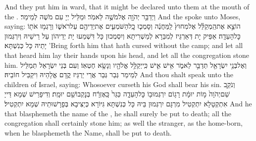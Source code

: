 {And they put him in ward, that it might be declared unto them at the mouth of the \lord.}{}
{וַיְדַבֵּ֥ר יְהֹוָ֖ה אֶל\maqqaf מֹשֶׁ֥ה לֵּאמֹֽר׃}
{וּמַלֵּיל יְיָ עִם מֹשֶׁה לְמֵימַר׃}
{And the \lord\space spoke unto Moses, saying:}{}
{הוֹצֵ֣א אֶת\maqqaf הַֽמְקַלֵּ֗ל אֶל\maqqaf מִחוּץ֙ לַֽמַּחֲנֶ֔ה וְסָמְכ֧וּ כׇֽל\maqqaf הַשֹּׁמְעִ֛ים אֶת\maqqaf יְדֵיהֶ֖ם עַל\maqqaf רֹאשׁ֑וֹ וְרָגְמ֥וּ אֹת֖וֹ כׇּל\maqqaf הָעֵדָֽה׃}
{אַפֵּיק יָת דְּאַרְגֵּיז לְמִבַּרָא לְמַשְׁרִיתָא וְיִסְמְכוּן כָּל דִּשְׁמַעוּ יָת יְדֵיהוֹן עַל רֵישֵׁיהּ וְיִרְגְּמוּן יָתֵיהּ כָּל כְּנִשְׁתָּא׃}
{’Bring forth him that hath cursed without the camp; and let all that heard him lay their hands upon his head, and let all the congregation stone him.}{}
{וְאֶל\maqqaf בְּנֵ֥י יִשְׂרָאֵ֖ל תְּדַבֵּ֣ר לֵאמֹ֑ר אִ֥ישׁ אִ֛ישׁ כִּֽי\maqqaf יְקַלֵּ֥ל אֱלֹהָ֖יו וְנָשָׂ֥א חֶטְאֽוֹ׃}
{וְעִם בְּנֵי יִשְׂרָאֵל תְּמַלֵּיל לְמֵימַר גְּבַר גְּבַר אֲרֵי יַרְגֵּיז קֳדָם אֱלָהֵיהּ וִיקַבֵּיל חוֹבֵיהּ׃}
{And thou shalt speak unto the children of Israel, saying: Whosoever curseth his God shall bear his sin.}{}
{וְנֹקֵ֤ב שֵׁם\maqqaf יְהֹוָה֙ מ֣וֹת יוּמָ֔ת רָג֥וֹם יִרְגְּמוּ\maqqaf ב֖וֹ כׇּל\maqqaf הָעֵדָ֑ה כַּגֵּר֙ כָּֽאֶזְרָ֔ח בְּנׇקְבוֹ\maqqaf שֵׁ֖ם יוּמָֽת׃}
{וְדִיפָרֵישׁ שְׁמָא דַּייָ אִתְקְטָלָא יִתְקְטִיל מִרְגָּם יִרְגְּמוּן בֵּיהּ כָּל כְּנִשְׁתָּא גִּיּוֹרָא כְּיַצִּיבָא בְּפָרָשׁוּתֵיהּ שְׁמָא יִתְקְטִיל׃}
{And he that blasphemeth the name of the \lord, he shall surely be put to death; all the congregation shall certainly stone him; as well the stranger, as the home-born, when he blasphemeth the Name, shall be put to death.}{}
